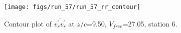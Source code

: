 \begin{figure}[H]
\centering
\texttt{[image: figs/run\_57/run\_57\_rr\_contour]}
\caption{Contour plot of $\overline{v_{r}^{\prime} v_{r}^{\prime}}$ at $z/c$=9.50, $V_{free}$=27.05, station 6.}
\label{fig:run_57_rr_contour}
\end{figure}


